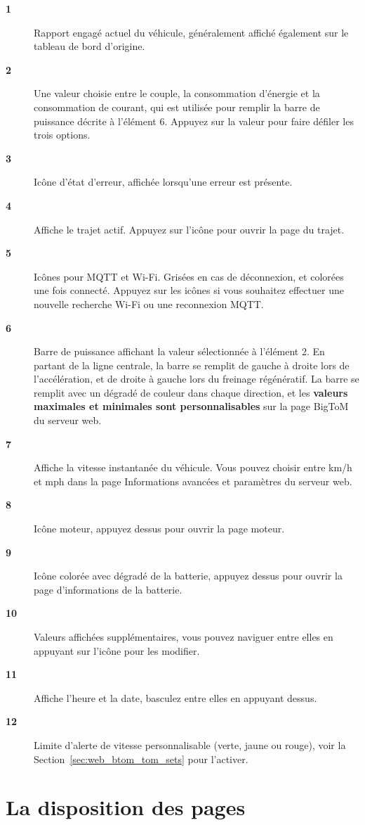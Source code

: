 \begin{description}
\item[\textbf{1}] Rapport engagé actuel du véhicule, généralement affiché également sur le tableau de bord d'origine.
\item[\textbf{2}] Une valeur choisie entre le couple, la consommation d'énergie et la consommation de courant, qui est utilisée pour remplir la barre de puissance décrite à l'élément 6. Appuyez sur la valeur pour faire défiler les trois options.
\item[\textbf{3}] Icône d'état d'erreur, affichée lorsqu'une erreur est présente.
\item[\textbf{4}] Affiche le trajet actif. Appuyez sur l'icône pour ouvrir la page du trajet.
\item[\textbf{5}] Icônes pour MQTT et Wi-Fi. Grisées en cas de déconnexion, et colorées une fois connecté. Appuyez sur les icônes si vous souhaitez effectuer une nouvelle recherche Wi-Fi ou une reconnexion MQTT.
\item[\textbf{6}] Barre de puissance affichant la valeur sélectionnée à l'élément 2. En partant de la ligne centrale, la barre se remplit de gauche à droite lors de l'accélération, et de droite à gauche lors du freinage régénératif. La barre se remplit avec un dégradé de couleur dans chaque direction, et les \textbf{valeurs maximales et minimales sont personnalisables} sur la page BigToM du serveur web.
\item[\textbf{7}] Affiche la vitesse instantanée du véhicule. Vous pouvez choisir entre km/h et mph dans la page Informations avancées et paramètres du serveur web.
\item[\textbf{8}] Icône moteur, appuyez dessus pour ouvrir la page moteur.
\item[\textbf{9}] Icône colorée avec dégradé de la batterie, appuyez dessus pour ouvrir la page d'informations de la batterie.
\item[\textbf{10}] Valeurs affichées supplémentaires, vous pouvez naviguer entre elles en appuyant sur l'icône pour les modifier.
\item[\textbf{11}] Affiche l'heure et la date, basculez entre elles en appuyant dessus.
\item[\textbf{12}] Limite d'alerte de vitesse personnalisable (verte, jaune ou rouge), voir la Section~\ref{sec:web_btom_tom_sets} pour l'activer.
\end{description}

\section{La disposition des pages}
\label{sec:main-layout}

